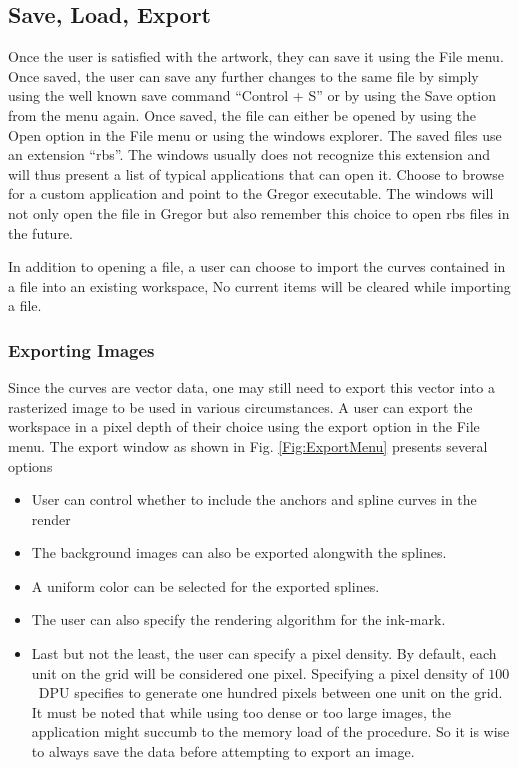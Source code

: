 \subsection{Save, Load, Export}
{
    Once the user is satisfied with the artwork, they can save it using the File menu. Once saved, the user can save any further changes to the same file by simply using the well known save command ``Control + S'' or by using the Save option from the menu again. Once saved, the file can either be opened by using the Open option in the File menu or using the windows explorer. The saved files use an extension ``rbs''. The windows usually does not recognize this extension and will thus present a list of typical applications that can open it. Choose to browse for a custom application and point to the Gregor executable. The windows will not only open the file in Gregor but also remember this choice to open rbs files in the future.
    
    In addition to opening a file, a user can choose to import the curves contained in a file into an existing workspace, No current items will be cleared while importing a file.
    
    \subsubsection{Exporting Images}
    {
        Since the curves are vector data, one may still need to export this vector into a rasterized image to be used in various circumstances. A user can export the workspace in a pixel depth of their choice using the export option in the File menu. The export window as shown in Fig. \ref{Fig:ExportMenu} presents several options
        \begin{itemize}
          \item User can control whether to include the anchors and spline curves in the render
          \item The background images can also be exported alongwith the splines.
          \item A uniform color can be selected for the exported splines.
          \item The user can also specify the rendering algorithm for the ink-mark.
          \item Last but not the least, the user can specify a pixel density. By default, each unit on the grid will be considered one pixel. Specifying a pixel density of $100$~DPU specifies to generate one hundred pixels between one unit on the grid. It must be noted that while using too dense or too large images, the application might succumb to the memory load of the procedure. So it is wise to always save the data before attempting to export an image.
        \end{itemize}

}}
